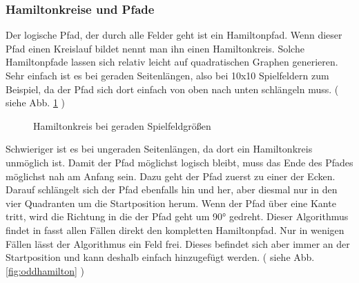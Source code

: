 \documentclass[a4paper,10pt,ngerman]{scrartcl}
\newcommand{\abbref}[1]{
  siehe Abb. \ref{#1}
}
\begin{document}
\subsubsection{Hamiltonkreise und Pfade}
Der logische Pfad, der durch alle Felder geht ist ein Hamiltonpfad. Wenn dieser Pfad einen Kreislauf bildet nennt man ihn einen Hamiltonkreis.
Solche Hamiltonpfade lassen sich relativ leicht auf quadratischen Graphen generieren.
Sehr einfach ist es bei geraden Seitenlängen, also bei 10x10 Spielfeldern zum Beispiel,
da der Pfad sich dort einfach von oben nach unten schlängeln muss. (\abbref{fig:evenhamilton})

\begin{figure}[ht]
  \centering
  \caption{Hamiltonkreis bei geraden Spielfeldgrößen}
  \label{fig:evenhamilton}
\end{figure}

Schwieriger ist es bei ungeraden Seitenlängen, da dort ein Hamiltonkreis unmöglich ist.
Damit der Pfad möglichst logisch bleibt, muss das Ende des Pfades möglichst nah am Anfang sein.
Dazu geht der Pfad zuerst zu einer der Ecken.
Darauf schlängelt sich der Pfad ebenfalls hin und her, aber diesmal nur in den vier Quadranten um die Startposition herum.
Wenn der Pfad über eine Kante tritt, wird die Richtung in die der Pfad geht um 90° gedreht.
Dieser Algorithmus findet in fasst allen Fällen direkt den kompletten Hamiltonpfad.
Nur in wenigen Fällen lässt der Algorithmus ein Feld frei. Dieses befindet sich aber immer an der Startposition und kann deshalb einfach hinzugefügt werden.
(\abbref{fig:oddhamilton})
\end{document}
